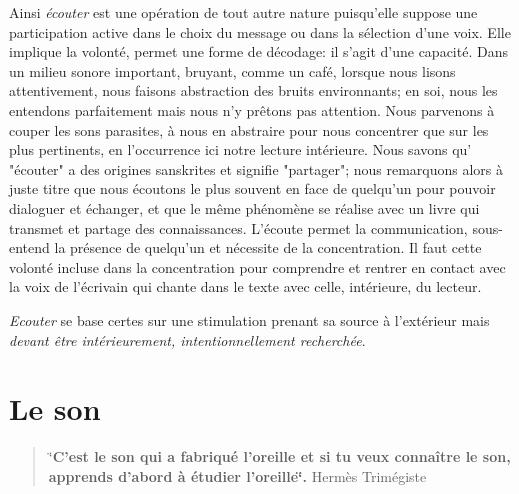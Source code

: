 Ainsi \emph{écouter} est une opération de tout autre nature
puisqu'elle suppose une participation active dans le choix du message
ou dans la sélection d'une voix. Elle  implique la volonté,
permet une forme de décodage: il s'agit d'une capacité. Dans un milieu sonore important, bruyant, comme un café, lorsque nous lisons attentivement, nous faisons abstraction
des bruits environnants; en soi, nous les entendons parfaitement mais nous n'y
prêtons pas attention. Nous parvenons à couper les sons parasites, à nous en abstraire pour
nous concentrer que sur les plus  pertinents, en l'occurrence ici  notre lecture intérieure.
Nous savons qu' "écouter" a des origines sanskrites et signifie "partager"; nous remarquons alors à juste titre que nous écoutons le plus souvent en face de quelqu'un pour pouvoir dialoguer et échanger, et que le même phénomène se réalise avec un livre qui transmet et partage des connaissances. L'écoute permet la communication, sous-entend la présence de quelqu'un et nécessite de la  concentration. Il faut cette volonté incluse dans la concentration pour comprendre et rentrer en contact avec la voix de  l'écrivain qui chante dans le texte avec celle, intérieure,  du lecteur.

 





\emph{Ecouter} se base certes sur une stimulation prenant sa source à
l'extérieur mais \emph{devant être intérieurement, intentionnellement
  recherchée}.




\section{Le son}
\begin{quotation}
	\char`\"{}\textbf{C'est le son qui a fabriqué l'oreille et si tu veux connaître
	le son, apprends d'abord à étudier l\textquoteright oreille\char`\"{}.}
	Hermès Trimégiste
\end{quotation}

